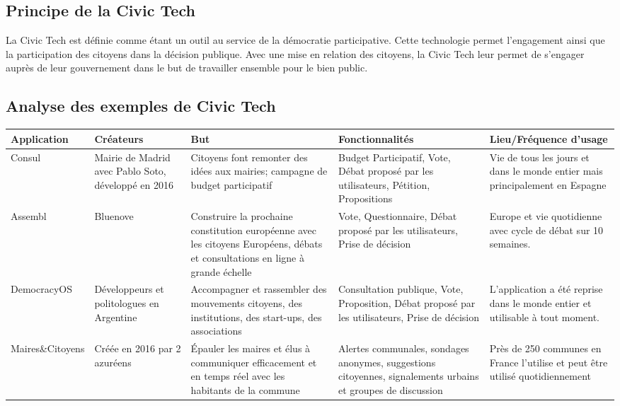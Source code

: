 \subsection{Principe de la Civic Tech}
\vskip 0.25cm
\noindent
La Civic Tech est définie comme étant un outil au service de la démocratie participative. Cette technologie permet l'engagement ainsi que la participation des citoyens dans la décision publique. Avec une mise en relation des citoyens, la Civic Tech leur permet de s'engager auprès de leur gouvernement dans le but de travailler ensemble pour le bien public.
\vskip 0.25cm
\subsection{Analyse des exemples de Civic Tech}

\begin{tabularx}{\textwidth}{X|X|X|X|X}
    \color{blue}Application & \color{blue} Créateurs & \color{blue} But & \color{blue} Fonctionnalités & \color{blue} Lieu/Fréquence d'usage  \\
    \hline
    Consul & Mairie de Madrid avec Pablo Soto, développé en 2016 & Citoyens font remonter des idées aux mairies; campagne de budget participatif & Budget Participatif, Vote, Débat proposé par les utilisateurs, Pétition, Propositions & Vie de tous les jours et dans le monde entier mais principalement en Espagne \\
    \hline
    Assembl & Bluenove & Construire la prochaine constitution européenne avec les citoyens Européens,
    débats et consultations en ligne à grande échelle & Vote, Questionnaire, Débat proposé par les utilisateurs, Prise de décision & Europe et vie quotidienne avec cycle de débat sur 10 semaines.\\
    \hline
    DemocracyOS & Développeurs et politologues en Argentine & Accompagner et rassembler des mouvements citoyens, des institutions, des start-ups, des associations & Consultation publique, Vote, Proposition, Débat proposé par les utilisateurs, Prise de décision & L'application a été reprise dans le monde entier et utilisable à tout moment.\\
    \hline
    Maires\&Citoyens & Créée en 2016 par 2 azuréens & Épauler les maires et élus
    à communiquer efficacement et en temps réel avec les habitants de la commune & Alertes communales, sondages anonymes, suggestions citoyennes, signalements urbains et groupes de discussion & Près de 250 communes en France l'utilise et peut être utilisé quotidiennement\\

\end{tabularx}
